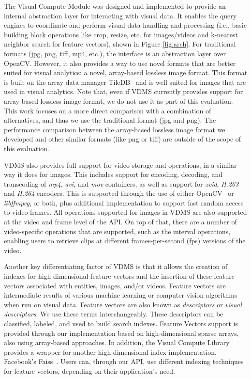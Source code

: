 The Visual Compute Module was designed and implemented to provide
an internal abstraction layer for interacting with visual data.
It enables the query engines to coordinate and perform
visual data handling and processing
(i.e., basic building block operations like crop, resize, etc. for images/videos
and k-nearest neighbor search for feature vectors),
shown in Figure \ref{fig:arch}.
For traditional formats (jpg, png, tiff, mp4, etc.),
the interface is an abstraction layer over OpenCV.
However, it also provides a way to use novel formats that are
better suited for visual analytics: a novel, array-based lossless image format.
This format is built on the array data manager TileDB~\cite{TileDB} and
is well suited for images that are used in visual analytics.
Note that, even if VDMS currently provides support for array-based lossless
image format, we do not use it as part of this evaluation.
This work focuses on a more direct comparison with a combination of alternatives,
and thus we use the traditional format (jpg and png).
The performance comparison between the array-based lossless image format
we developed and other similar formats (like png or tiff) are outside of the
scope of this evaluation.

VDMS also provides full support for video storage and operations,
in a similar way it does for images.
This includes support for encoding, decoding, and transcoding of
\textit{mp4}, \textit{avi}, and \textit{mov} containers,
as well as support for \textit{xvid}, \textit{H.263} and \textit{H.264} encoders.
This is supported through the use of either OpenCV~\cite{opencv}
or \textit{libffmpeg}\cite{ffmpeg}, or both,
plus additional implementation to support fast random access to video frames.
All operations supported for images in VDMS are also supported at the
video and frame level of the API.
On top of that, there are a number of video-specific operations that
are supported, such as the interval operations,
enabling users to retrieve clips at different
frames-per-second (fps) versions of the video.

Another key differentiating factor of VDMS is that it allows the creation of
indexes for high-dimensional feature vectors and the insertion of
these feature vectors associated with entities, images, and/or videos.
Feature vectors are intermediate results of various machine
learning or computer vision algorithms when run on visual data.
Feature vectors are also known as \textit{descriptors}
or \textit{visual descriptors}.
We use these terms interchangeably.
These descriptors can be classified, labeled, and used to build search indexes.
Feature Vectors support is provided through our implementation based
on high-dimensional sparse arrays, also using array-based approaches.
In addition, the Visual Compute Library provides a wrapper
for another high-dimensional index implementation,
Facebook's Faiss~\cite{faiss}.
Users can, through our API, use different indexing techniques
for feature vectors, depending on their application's need.



